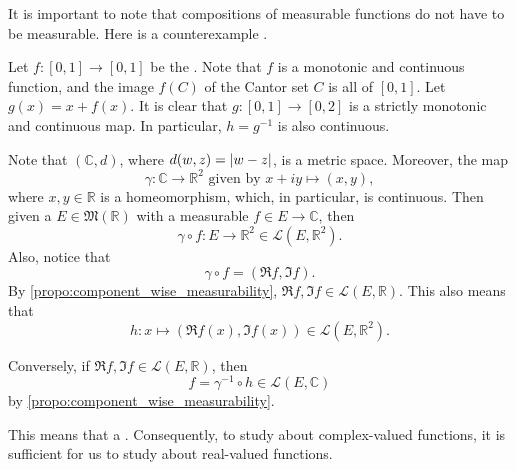 \documentclass[notoc,notitlepage]{tufte-book}
\begin{document}
\begin{warning}\label{warning:composition_of_measurable_functions_need_not_be_measurable}
  It is important to note that compositions of measurable functions do not have
  to be measurable. Here is a counterexample .

  Let $f : [0, 1] \to [0, 1]$ be the 
  . Note that $f$ is a monotonic and continuous
  function, and the image $f(C)$ of the Cantor set $C$ is all of $[0, 1]$. Let
  $g(x) = x + f(x)$. It is clear that $g: [0, 1] \to [0, 2]$ is a strictly
  monotonic and continuous map. In particular, $h = g^{-1}$ is also continuous.
\end{warning}

\begin{remark}\label{remark:about_complex_val_fns}
  Note that $(\mathbb{C}, d)$, where $d(w, z) = \left|w - z\right|$, is a metric space.
  Moreover, the map
  \begin{equation*}
    \gamma : \mathbb{C} \to \mathbb{R}^2 \text{ given by } x + iy \mapsto (x,
    y),
  \end{equation*}
  where $x, y \in \mathbb{R}$ is a homeomorphism, which, in particular, is
  continuous. Then given a $E \in \mathfrak{M}(\mathbb{R})$ with a measurable $f
  \in E \to \mathbb{C}$, then
  \begin{equation*}
    \gamma \circ f : E \to \mathbb{R}^2 \in \mathcal{L}(E, \mathbb{R}^2).
  \end{equation*}
  Also, notice that
  \begin{equation*}
    \gamma \circ f = (\Re f, \Im f).
  \end{equation*}
  By \cref{propo:component_wise_measurability}, $\Re f, \Im f \in \mathcal{L}(E,
  \mathbb{R})$. This also means that
  \begin{equation*}
    h : x \mapsto (\Re f(x), \Im f(x)) \in \mathcal{L}(E, \mathbb{R}^2).
  \end{equation*}

  Conversely, if $\Re f, \Im f \in \mathcal{L}(E, \mathbb{R})$, then
  \begin{equation*}
    f = \gamma^{-1} \circ h \in \mathcal{L}(E, \mathbb{C})
  \end{equation*}
  by \cref{propo:component_wise_measurability}.

  This means that a . Consequently, to study about
  complex-valued functions, it is sufficient for us to study about real-valued
  functions.
\end{remark}
\end{document}
